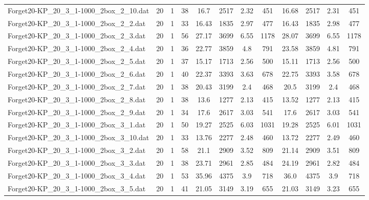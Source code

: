 \begin{sidewaystable}[!ht]
{\begin{tabular}{lccccccccccc}
Forget20-KP\_20\_3\_1-1000\_2box\_2\_10.dat & 20 & 1 & 38 & 16.7 & 2517 & 2.32 & 451 & 16.68 & 2517 &  \textcolor{blue2}{2.31} & 451 \\
Forget20-KP\_20\_3\_1-1000\_2box\_2\_2.dat & 20 & 1 & 33 & 16.43 & 1835 &  \textcolor{blue2}{2.97} & 477 & 16.43 & 1835 & 2.98 & 477 \\
Forget20-KP\_20\_3\_1-1000\_2box\_2\_3.dat & 20 & 1 & 56 & 27.17 & 3699 & 6.55 & 1178 & 28.07 & 3699 & 6.55 & 1178 \\
Forget20-KP\_20\_3\_1-1000\_2box\_2\_4.dat & 20 & 1 & 36 & 22.77 & 3859 &  \textcolor{blue2}{4.8} & 791 & 23.58 & 3859 & 4.81 & 791 \\
Forget20-KP\_20\_3\_1-1000\_2box\_2\_5.dat & 20 & 1 & 37 & 15.17 & 1713 &  \textcolor{blue2}{2.56} & 500 & 15.11 & 1713 &  \textcolor{blue2}{2.56} & 500 \\
Forget20-KP\_20\_3\_1-1000\_2box\_2\_6.dat & 20 & 1 & 40 & 22.37 & 3393 & 3.63 & 678 & 22.75 & 3393 &  \textcolor{blue2}{3.58} & 678 \\
Forget20-KP\_20\_3\_1-1000\_2box\_2\_7.dat & 20 & 1 & 38 & 20.43 & 3199 &  \textcolor{blue2}{2.4} & 468 & 20.5 & 3199 &  \textcolor{blue2}{2.4} & 468 \\
Forget20-KP\_20\_3\_1-1000\_2box\_2\_8.dat & 20 & 1 & 38 & 13.6 & 1277 &  \textcolor{blue2}{2.13} & 415 & 13.52 & 1277 &  \textcolor{blue2}{2.13} & 415 \\
Forget20-KP\_20\_3\_1-1000\_2box\_2\_9.dat & 20 & 1 & 34 & 17.6 & 2617 &  \textcolor{blue2}{3.03} & 541 & 17.6 & 2617 &  \textcolor{blue2}{3.03} & 541 \\
Forget20-KP\_20\_3\_1-1000\_2box\_3\_1.dat & 20 & 1 & 50 & 19.27 & 2525 & 6.03 & 1031 & 19.28 & 2525 &  \textcolor{blue2}{6.01} & 1031 \\
Forget20-KP\_20\_3\_1-1000\_2box\_3\_10.dat & 20 & 1 & 33 & 13.76 & 2277 &  \textcolor{blue2}{2.48} & 460 & 13.72 & 2277 & 2.49 & 460 \\
Forget20-KP\_20\_3\_1-1000\_2box\_3\_2.dat & 20 & 1 & 58 & 21.1 & 2909 & 3.52 & 809 & 21.14 & 2909 &  \textcolor{blue2}{3.51} & 809 \\
Forget20-KP\_20\_3\_1-1000\_2box\_3\_3.dat & 20 & 1 & 38 & 23.71 & 2961 & 2.85 & 484 & 24.19 & 2961 &  \textcolor{blue2}{2.82} & 484 \\
Forget20-KP\_20\_3\_1-1000\_2box\_3\_4.dat & 20 & 1 & 53 & 35.96 & 4375 &  \textcolor{blue2}{3.9} & 718 & 36.0 & 4375 &  \textcolor{blue2}{3.9} & 718 \\
Forget20-KP\_20\_3\_1-1000\_2box\_3\_5.dat & 20 & 1 & 41 & 21.05 & 3149 &  \textcolor{blue2}{3.19} & 655 & 21.03 & 3149 & 3.23 & 655 \\

\end{tabular}}
\end{sidewaystable}
